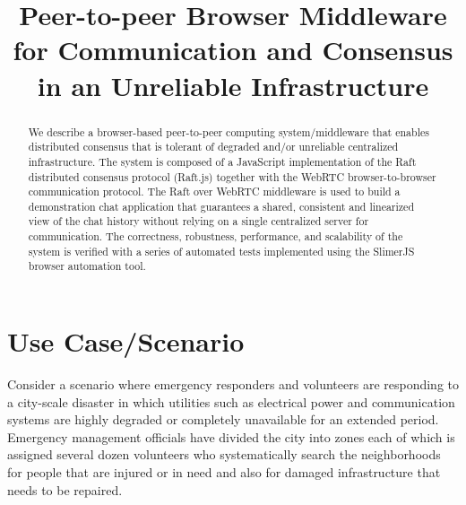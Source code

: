 \documentclass[conference,compsoc]{./IEEEtran/IEEEtran}
\begin{document}
\title{Peer-to-peer Browser Middleware for Communication and Consensus in an Unreliable Infrastructure}

\author{
\and
{}
}

\maketitle

\begin{abstract}
We describe a browser-based peer-to-peer computing system/middleware that enables distributed consensus that is tolerant of degraded and/or unreliable centralized infrastructure. The system is composed of a JavaScript implementation of the Raft distributed consensus protocol (Raft.js) together with the WebRTC browser-to-browser communication protocol. The Raft over WebRTC middleware is used to build a demonstration chat application that guarantees a shared, consistent and linearized view of the chat history without relying on a single centralized server for communication. The correctness, robustness, performance, and scalability of the system is verified with a series of automated tests implemented using the SlimerJS browser automation tool.
\end{abstract}

\section{Use Case/Scenario}
Consider a scenario where emergency responders and volunteers are responding to a city-scale disaster in which utilities such as electrical power and communication systems are highly degraded or completely unavailable for an extended period. Emergency management officials have divided the city into zones each of which is assigned several dozen volunteers who systematically search the neighborhoods for people that are injured or in need and also for damaged infrastructure that needs to be repaired.
\end{document}
